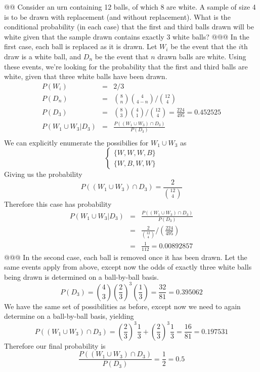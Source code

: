 \documentclass[10pt]{article}
\begin{document}
\begin{easylist}[enumerate]
    @@ Consider an urn containing 12 balls, of which 8 are white. A sample of size 4 is to be drawn with replacement
    (and without replacement). What is the conditional probability (in each case) that the first and third balls drawn
    will be white given that the sample drawn contains exactly 3 white balls?
    @@@ In the first case, each ball is replaced as it is drawn. Let $W_i$ be the event that the $i$th draw is a white
    ball, and $D_n$ be the event that $n$ drawn balls are white. Using these events, we're looking for the probability
    that the first and third balls are white, given that three white balls have been drawn.
        \[
            \begin{aligned}
                P(W_i) &=& 2/3\\
                P(D_n) &=& \binom{8}{n} \binom{4}{4 - n} \Big / \binom{12}{4}\\
                P(D_3) &=& \binom{8}{3} \binom{4}{1} \Big / \binom{12}{4} = \frac{224}{495} = 0.452525\\
                P(W_1 \cup W_3|D_3) &=& \frac{P((W_1 \cup W_3) \cap D_3)}{P(D_3)}\\
            \end{aligned}
        \]
    We can explicitly enumerate the possibilies for $W_1 \cup W_3$ as
        \[
            \begin{cases}
                \{ W, W, W, B \}\\
                \{ W, B, W, W \}
            \end{cases}
        \]
    Giving us the probability
        \[ P((W_1 \cup W_3) \cap D_3) = \frac{2}{\binom{12}{4} } \]
    Therefore this case has probability
        \[
            \begin{aligned}
                P(W_1 \cup W_3|D_3) &=& \frac{P((W_1 \cup W_3) \cap D_3)}{P(D_3)}\\
                                    &=& \frac{2}{\binom{12}{4} } \Big / \left( \frac{224}{495} \right)\\
                                    &=& \frac{1}{112} = \boxed{0.00892857}
            \end{aligned}
        \]
    @@@ In the second case, each ball is removed once it has been drawn. Let the same events apply from above, except
    now the odds of exactly three white balls being drawn is determined on a ball-by-ball basis.
        \[ P(D_3) = \binom{4}{3} {\left( \frac{2}{3} \right)}^3 \left( \frac{1}{3} \right) = \frac{32}{81} = 0.395062 \]
    We have the same set of possibilities as before, except now we need to again determine on a ball-by-ball basis,
    yielding
        \[ P((W_1 \cup W_3) \cap D_3) = {\left( \frac{2}{3} \right)}^3 \frac{1}{3} + {\left( \frac{2}{3} \right)}^3
        \frac{1}{3} = \frac{16}{81} = 0.197531 \]
    Therefore our final probability is
        \[ \frac{P((W_1 \cup W_3) \cap D_3)}{P(D_3)} = \frac{1}{2} = \boxed{0.5} \]


\end{easylist}
\end{document}
